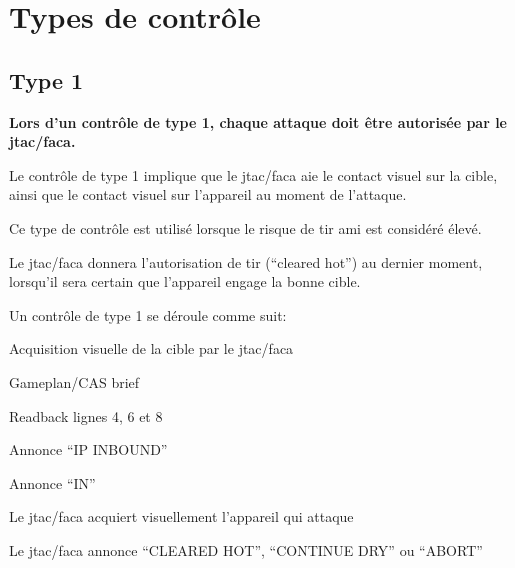 \chapter{Types de contrôle}
\label{controltypes}

\e
    \item {}
\ed

\section{Type 1}
\e
    \item \textbf{Lors d'un contrôle de type 1, chaque attaque doit être autorisée par le \gls{jtac}/\gls{faca}.}
    \item Le contrôle de type 1 implique que le \gls{jtac}/\gls{faca} aie le contact visuel sur la cible, ainsi que le contact visuel sur l'appareil au moment de l'attaque.
    \item Ce type de contrôle est utilisé lorsque le risque de tir ami est considéré élevé.
    \item Le \gls{jtac}/\gls{faca} donnera l'autorisation de tir (``cleared hot'') au dernier moment, lorsqu'il sera certain que l'appareil engage la bonne cible.
    \item Un contrôle de type 1 se déroule comme suit:
    \ee
        \item Acquisition visuelle de la cible par le \gls{jtac}/\gls{faca}
        \item Gameplan/CAS brief
        \item Readback lignes 4, 6 et 8
        \item Annonce ``IP INBOUND''
        \item Annonce ``IN''
        \item Le \gls{jtac}/\gls{faca} acquiert visuellement l'appareil qui attaque
        \item Le \gls{jtac}/\gls{faca} annonce ``CLEARED HOT'', ``CONTINUE DRY'' ou ``ABORT''
    \ed
\ed

